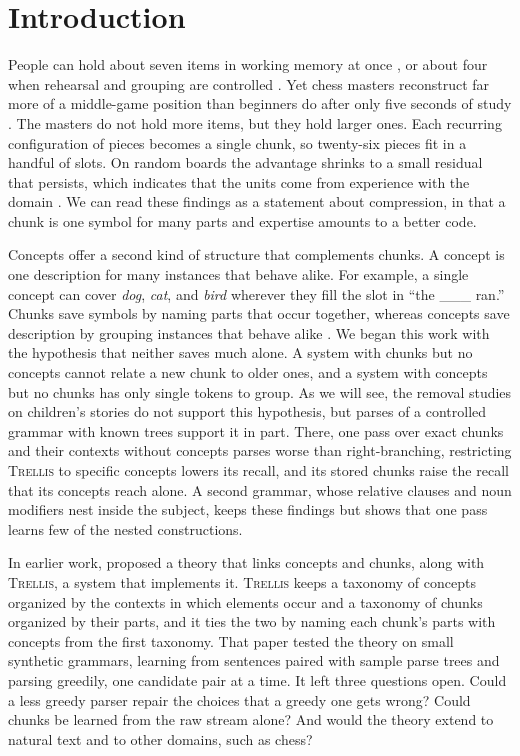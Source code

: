 \documentclass[11pt,letterpaper]{article}
\newcommand{\trellis}{\textsc{Trellis}}
\begin{document}
\section{Introduction}

People can hold about seven items in working memory at once \citep{miller-magical-seven},
or about four when rehearsal and grouping are controlled \citep{cowan-magical-four}. Yet
chess masters reconstruct far more of a middle-game position than beginners do after only
five seconds of study \citep{chase-simon}. The masters do not hold more items, but they
hold larger ones. Each recurring configuration of pieces becomes a single chunk, so
twenty-six pieces fit in a handful of slots. On random boards the advantage shrinks to a
small residual that persists, which indicates that the units come from experience with
the domain \citep{gobet-simon-random}. We can read these findings as a statement about
compression, in that a chunk is one symbol for many parts and expertise amounts to a
better code.

Concepts offer a second kind of structure that complements chunks. A concept is one
description for many instances that behave alike. For example, a single concept can
cover \textit{dog}, \textit{cat}, and \textit{bird} wherever they fill the slot in ``the
\_\_\_ ran.'' Chunks save symbols by naming parts that occur together, whereas concepts
save description by grouping instances that behave alike
\citep{langley-concepts-chunks-2025}. We began this work with the hypothesis that neither
saves much alone. A system with chunks but no concepts cannot relate a new chunk to older
ones, and a system with concepts but no chunks has only single tokens to group. As we
will see, the removal studies on children's stories do not support this hypothesis, but
parses of a controlled grammar with known trees support it in part. There, one pass
over exact chunks and their contexts without concepts parses worse than right-branching,
restricting \trellis{} to specific concepts lowers its recall, and its stored chunks
raise the recall that its concepts reach alone. A second grammar, whose relative clauses
and noun modifiers nest inside the subject, keeps these findings but shows that one pass
learns few of the nested constructions.

In earlier work, \citet{singaravadivelan-langley-acs} proposed a theory that links
concepts and chunks, along with \trellis{}, a system that implements it. \trellis{} keeps
a taxonomy of concepts organized by the contexts in which elements occur and a taxonomy
of chunks organized by their parts, and it ties the two by naming each chunk's parts
with concepts from the first taxonomy. That paper tested the theory on small synthetic
grammars, learning from sentences paired with sample parse trees and parsing greedily,
one candidate pair at a time. It left three questions open. Could a less greedy parser
repair the choices that a greedy one gets wrong? Could chunks be learned from the raw
stream alone? And would the theory extend to natural text and to other domains, such as
chess?
\end{document}
